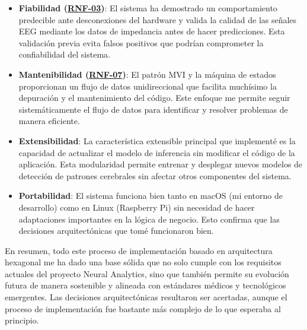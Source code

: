 \begin{itemize}
    \item \textbf{Fiabilidad (\hyperref[rnf-03]{RNF-03})}: El sistema ha demostrado un comportamiento predecible ante desconexiones del hardware y valida la calidad de las señales EEG mediante los datos de impedancia antes de hacer predicciones. Esta validación previa evita falsos positivos que podrían comprometer la confiabilidad del sistema.
    
    \item \textbf{Mantenibilidad (\hyperref[rnf-07]{RNF-07})}: El patrón MVI y la máquina de estados proporcionan un flujo de datos unidireccional que facilita muchísimo la depuración y el mantenimiento del código. Este enfoque me permite seguir sistemáticamente el flujo de datos para identificar y resolver problemas de manera eficiente.
    
    \item \textbf{Extensibilidad}: La característica extensible principal que implementé es la capacidad de actualizar el modelo de inferencia sin modificar el código de la aplicación. Esta modularidad permite entrenar y desplegar nuevos modelos de detección de patrones cerebrales sin afectar otros componentes del sistema.
    
    \item \textbf{Portabilidad}: El sistema funciona bien tanto en macOS (mi entorno de desarrollo) como en Linux (Raspberry Pi) sin necesidad de hacer adaptaciones importantes en la lógica de negocio. Esto confirma que las decisiones arquitectónicas que tomé funcionaron bien.
\end{itemize}

En resumen, todo este proceso de implementación basado en arquitectura hexagonal me ha dado una base sólida que no solo cumple con los requisitos actuales del proyecto Neural Analytics, sino que también permite su evolución futura de manera sostenible y alineada con estándares médicos y tecnológicos emergentes. Las decisiones arquitectónicas resultaron ser acertadas, aunque el proceso de implementación fue bastante más complejo de lo que esperaba al principio.